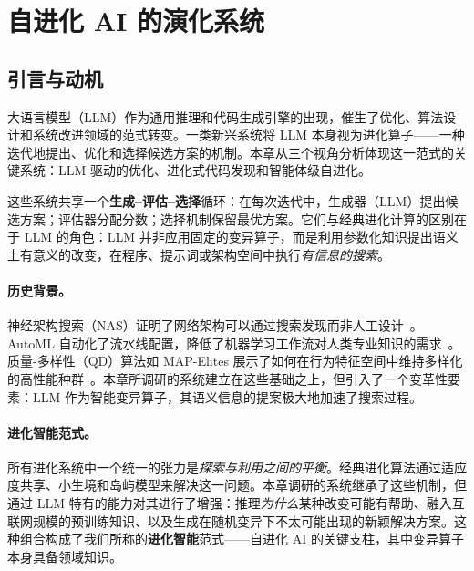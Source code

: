 
\section{自进化 AI 的演化系统}
\label{ch:systems}

\subsection{引言与动机}

大语言模型（LLM）作为通用推理和代码生成引擎的出现，催生了优化、算法设计和系统改进领域的范式转变。一类新兴系统将 LLM 本身视为进化算子——一种迭代地提出、优化和选择候选方案的机制。本章从三个视角分析体现这一范式的关键系统：LLM 驱动的优化、进化式代码发现和智能体级自进化。

这些系统共享一个\textbf{生成--评估--选择}循环：在每次迭代中，生成器（LLM）提出候选方案；评估器分配分数；选择机制保留最优方案。它们与经典进化计算的区别在于 LLM 的角色：LLM 并非应用固定的变异算子，而是利用参数化知识提出语义上有意义的改变，在程序、提示词或架构空间中执行\emph{有信息的搜索}。

\paragraph{历史背景。}
神经架构搜索（NAS）证明了网络架构可以通过搜索发现而非人工设计~\citep{zoph2017neural}。AutoML 自动化了流水线配置，降低了机器学习工作流对人类专业知识的需求~\citep{feurer2015efficient}。质量-多样性（QD）算法如 MAP-Elites 展示了如何在行为特征空间中维持多样化的高性能种群~\citep{mouret2015illuminating}。本章所调研的系统建立在这些基础之上，但引入了一个变革性要素：LLM 作为智能变异算子，其语义信息的提案极大地加速了搜索过程。

\paragraph{进化智能范式。}
所有进化系统中一个统一的张力是\emph{探索与利用之间的平衡}。经典进化算法通过适应度共享、小生境和岛屿模型来解决这一问题。本章调研的系统继承了这些机制，但通过 LLM 特有的能力对其进行了增强：推理\emph{为什么}某种改变可能有帮助、融入互联网规模的预训练知识、以及生成在随机变异下不太可能出现的新颖解决方案。这种组合构成了我们所称的\textbf{进化智能}范式——自进化 AI 的关键支柱，其中变异算子本身具备领域知识。

